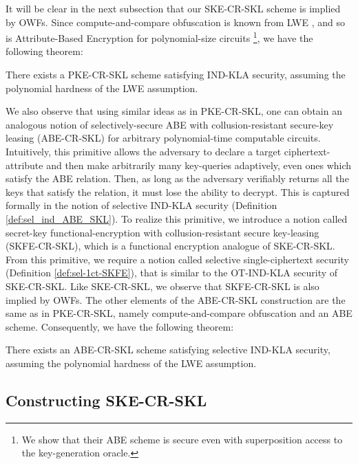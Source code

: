 It will be clear in the next subsection that our SKE-CR-SKL scheme is implied
by OWFs. Since compute-and-compare obfuscation is known from LWE
\cite{FOCS:GoyKopWat17,FOCS:WicZir17}, and so is Attribute-Based Encryption for
polynomial-size circuits
\cite{EC:BGGHNS14}\footnote{We show that their ABE scheme is secure
even with superposition access to the key-generation oracle.}, we have
the following theorem:

\begin{theorem}
There exists a PKE-CR-SKL scheme satisfying IND-KLA security, assuming
the polynomial hardness of the LWE assumption.
\end{theorem}

We also observe that using similar ideas as in PKE-CR-SKL, one can
obtain an analogous notion of selectively-secure ABE with
collusion-resistant secure-key
leasing (ABE-CR-SKL) for arbitrary polynomial-time computable circuits. Intuitively, this
primitive allows the adversary to declare a target ciphertext-attribute and then make arbitrarily many key-queries
adaptively, even ones which satisfy the ABE relation. Then, as long as
the adversary verifiably returns all the keys that satisfy the
relation, it must lose the ability to decrypt. This is captured
formally in the notion of selective IND-KLA security (Definition
\ref{def:sel_ind_ABE_SKL}). To realize this primitive, we introduce a
notion called secret-key functional-encryption with
collusion-resistant secure key-leasing
(SKFE-CR-SKL), which is a functional encryption analogue of SKE-CR-SKL.
From this primitive, we require a notion called selective
single-ciphertext security (Definition \ref{def:sel-1ct-SKFE}), that
is similar to the OT-IND-KLA security of SKE-CR-SKL. Like SKE-CR-SKL,
we observe that SKFE-CR-SKL is also implied by OWFs.
The other elements of the ABE-CR-SKL construction are the
same as in PKE-CR-SKL, namely compute-and-compare obfuscation and an
ABE scheme. Consequently, we have the following theorem:

\begin{theorem}
There exists an ABE-CR-SKL scheme satisfying selective IND-KLA security, assuming
the polynomial hardness of the LWE assumption.
\end{theorem}

\subsection{Constructing SKE-CR-SKL}

